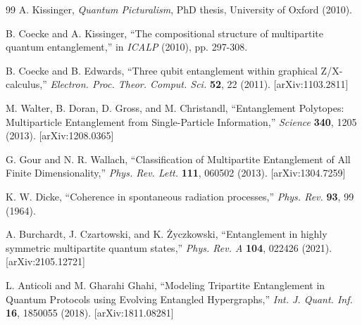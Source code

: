 \documentclass[12pt,a4paper]{article}
\begin{document}
\begin{thebibliography}{99}
	 A. Kissinger, \textit{Quantum Picturalism}, PhD thesis, University of Oxford (2010).

	 B. Coecke and A. Kissinger, ``The compositional structure of multipartite quantum entanglement,'' in \textit{ICALP} (2010), pp. 297-308.

	 B. Coecke and B. Edwards, ``Three qubit entanglement within graphical Z/X-calculus,'' \textit{Electron. Proc. Theor. Comput. Sci.} \textbf{52}, 22 (2011). [arXiv:1103.2811]

	 M. Walter, B. Doran, D. Gross, and M. Christandl, ``Entanglement Polytopes: Multiparticle Entanglement from Single-Particle Information,'' \textit{Science} \textbf{340}, 1205 (2013). [arXiv:1208.0365]

	 G. Gour and N. R. Wallach, ``Classification of Multipartite Entanglement of All Finite Dimensionality,'' \textit{Phys. Rev. Lett.} \textbf{111}, 060502 (2013). [arXiv:1304.7259]


	 K. W. Dicke, ``Coherence in spontaneous radiation processes,'' \textit{Phys. Rev.} \textbf{93}, 99 (1964).


	 A. Burchardt, J. Czartowski, and K. Życzkowski, ``Entanglement in highly symmetric multipartite quantum states,'' \textit{Phys. Rev. A} \textbf{104}, 022426 (2021). [arXiv:2105.12721]




	 L. Anticoli and M. Gharahi Ghahi, ``Modeling Tripartite Entanglement in Quantum Protocols using Evolving Entangled Hypergraphs,'' \textit{Int. J. Quant. Inf.} \textbf{16}, 1850055 (2018). [arXiv:1811.08281]


\end{thebibliography}
\end{document}
